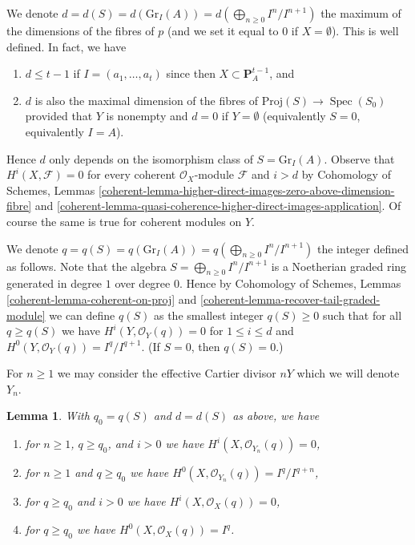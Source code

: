 \documentclass{stacks-project}
\theoremstyle{plain}
\newtheorem{lemma}[subsection]{Lemma}
\theoremstyle{definition}
\theoremstyle{remark}
\numberwithin{equation}{subsection}
\def\Spec{\mathop{\mathrm{Spec}}}
\begin{document}
\medskip\noindent
We denote
$d = d(S) = d(\text{Gr}_I(A)) = d(\bigoplus_{n \geq 0} I^n/I^{n + 1})$
the maximum of the dimensions of the fibres of $p$
(and we set it equal to $0$ if $X = \emptyset$).
This is well defined. In fact, we have
\begin{enumerate}
\item $d \leq t - 1$ if $I = (a_1, \ldots, a_t)$ since then
$X \subset \mathbf{P}^{t - 1}_A$, and
\item $d$ is also the maximal dimension of the fibres of
$\text{Proj}(S) \to \Spec(S_0)$ provided that $Y$
is nonempty and $d = 0$ if $Y = \emptyset$
(equivalently $S = 0$, equivalently $I = A$).
\end{enumerate}
Hence $d$ only depends on the isomorphism class of $S = \text{Gr}_I(A)$.
Observe that $H^i(X, \mathcal{F}) = 0$ for every coherent
$\mathcal{O}_X$-module $\mathcal{F}$ and $i > d$ by
Cohomology of Schemes, Lemmas
\ref{coherent-lemma-higher-direct-images-zero-above-dimension-fibre} and
\ref{coherent-lemma-quasi-coherence-higher-direct-images-application}.
Of course the same is true for coherent modules on $Y$.

\medskip\noindent
We denote
$q = q(S) = q(\text{Gr}_I(A)) = q(\bigoplus_{n \geq 0} I^n/I^{n + 1})$
the integer defined as follows. Note that the algebra
$S = \bigoplus_{n \geq 0} I^n/I^{n + 1}$
is a Noetherian graded ring generated in degree $1$ over degree $0$.
Hence by
Cohomology of Schemes, Lemmas \ref{coherent-lemma-coherent-on-proj} and
\ref{coherent-lemma-recover-tail-graded-module} we can define $q(S)$
as the smallest integer $q(S) \geq 0$ such that for all $q \geq q(S)$ we have
$H^i(Y, \mathcal{O}_Y(q)) = 0$ for $1 \leq i \leq d$ and
$H^0(Y, \mathcal{O}_Y(q)) = I^q/I^{q + 1}$.
(If $S = 0$, then $q(S) = 0$.)

\medskip\noindent
For $n \geq 1$ we may consider the effective Cartier divisor $nY$
which we will denote $Y_n$.

\begin{lemma}
\label{lemma-bound-q-and-d}
With $q_0 = q(S)$ and $d = d(S)$ as above, we have
\begin{enumerate}
\item for $n \geq 1$, $q \geq q_0$, and $i > 0$ we have
$H^i(X, \mathcal{O}_{Y_n}(q)) = 0$,
\item for $n \geq 1$ and $q \geq q_0$ we have
$H^0(X, \mathcal{O}_{Y_n}(q)) = I^q/I^{q + n}$,
\item for $q \geq q_0$ and $i > 0$ we have
$H^i(X, \mathcal{O}_X(q)) = 0$,
\item for $q \geq q_0$ we have
$H^0(X, \mathcal{O}_X(q)) = I^q$.
\end{enumerate}
\end{lemma}
\end{document}
